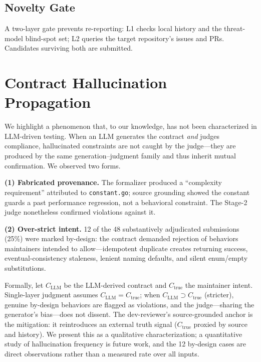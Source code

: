 \documentclass[sigconf]{acmart}
\begin{document}
\subsection{Novelty Gate}
A two-layer gate prevents re-reporting: L1 checks local history and the threat-model blind-spot set; L2 queries the target repository's issues and PRs. Candidates surviving both are submitted.

\section{Contract Hallucination Propagation}\label{sec:hallucination}
We highlight a phenomenon that, to our knowledge, has not been characterized in LLM-driven testing. When an LLM generates the contract \emph{and} judges compliance, hallucinated constraints are not caught by the judge---they are produced by the same generation--judgment family and thus inherit mutual confirmation. We observed two forms.

\textbf{(1) Fabricated provenance.} The formalizer produced a ``complexity requirement'' attributed to \texttt{constant.go}; source grounding showed the constant guards a past performance regression, not a behavioral constraint. The Stage-2 judge nonetheless confirmed violations against it.

\textbf{(2) Over-strict intent.} 12 of the 48 substantively adjudicated submissions (25\%) were marked by-design: the contract demanded rejection of behaviors maintainers intended to allow---idempotent duplicate creates returning success, eventual-consistency staleness, lenient naming defaults, and silent enum/empty substitutions.

Formally, let $C_{\mathrm{LLM}}$ be the LLM-derived contract and $C_{\mathrm{true}}$ the maintainer intent. Single-layer judgment assumes $C_{\mathrm{LLM}} = C_{\mathrm{true}}$; when $C_{\mathrm{LLM}} \supset C_{\mathrm{true}}$ (stricter), genuine by-design behaviors are flagged as violations, and the judge---sharing the generator's bias---does not dissent. The dev-reviewer's source-grounded anchor is the mitigation: it reintroduces an external truth signal ($C_{\mathrm{true}}$ proxied by source and history). We present this as a qualitative characterization; a quantitative study of hallucination frequency is future work, and the 12 by-design cases are direct observations rather than a measured rate over all inputs.

\end{document}
